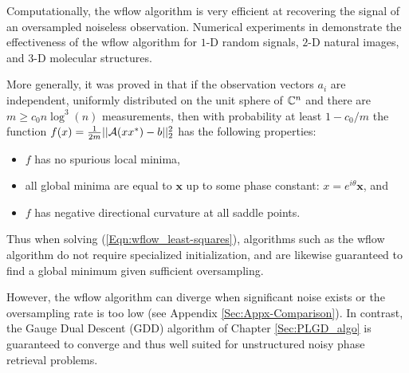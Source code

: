Computationally, the wflow algorithm is very efficient at recovering the signal of an oversampled noiseless observation.  Numerical experiments in \cite[Section 4]{DBLP:journals/tit/CandesLS15} demonstrate the effectiveness of the wflow algorithm for $1$-D random signals, $2$-D natural images, and $3$-D molecular structures.  


More generally, it was proved in \cite{sun2016geometric} that if the observation vectors $a_i$ are independent, uniformly distributed on the unit sphere of ${\mathbb C}^n$ and there are $m \geq c_0 n \log^3(n)$ measurements, then with probability at least $1-c_0/m$ the function $f(x) = \frac{1}{2m}||{\mathcal A}(xx^*) - b||_2^2$ has the following properties:

\begin{itemize} 		

\item 
$f$ has no spurious local minima,

\item
all global minima are equal to $\mathbf{x}$ up to some phase constant: $x = e^{i \theta}\mathbf{x}$, and

\item
$f$ has negative directional curvature at all saddle points.

\end{itemize}
Thus when solving (\ref{Eqn:wflow_least-squares}), algorithms such as the wflow algorithm do not require specialized initialization, and are likewise guaranteed to find a global minimum given sufficient oversampling.  


However, the wflow algorithm can diverge when significant noise exists or the oversampling rate is too low (see Appendix \ref{Sec:Appx-Comparison}).
In contrast, the Gauge Dual Descent (GDD) algorithm of Chapter \ref{Sec:PLGD_algo} is guaranteed to converge and thus well suited for unstructured noisy phase retrieval problems.






